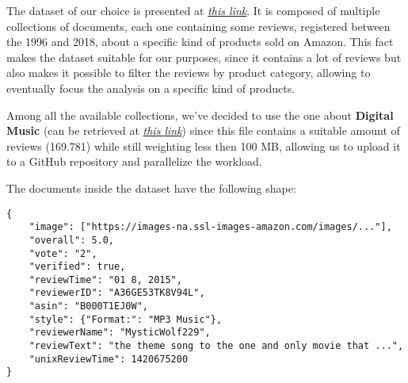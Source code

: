 The dataset of our choice is presented at \href{https://nijianmo.github.io/amazon/index.html}{\textit{this link}}. It is composed of multiple collections of documents, each one containing some reviews, registered between the 1996 and 2018, about a specific kind of products sold on Amazon. This fact makes the dataset suitable for our purposes, since it contains a lot of reviews but also makes it possible to filter the reviews by product category, allowing to eventually focus the analysis on a specific kind of products.

Among all the available collections, we've decided to use the one about \textbf{Digital Music} (can be retrieved at \href{https://jmcauley.ucsd.edu/data/amazon_v2/categoryFilesSmall/Digital_Music_5.json.gz}{\textit{this link}}) since this file contains a suitable amount of reviews (169.781) while still weighting less then 100 MB, allowing us to upload it to a GitHub repository and parallelize the workload.

The documents inside the dataset have the following shape: \\
\begin{verbatim}
{
    "image": ["https://images-na.ssl-images-amazon.com/images/..."], 
    "overall": 5.0, 
    "vote": "2",
    "verified": true, 
    "reviewTime": "01 8, 2015", 
    "reviewerID": "A36GE53TK8V94L", 
    "asin": "B000T1EJ0W", 
    "style": {"Format:": "MP3 Music"}, 
    "reviewerName": "MysticWolf229", 
    "reviewText": "the theme song to the one and only movie that ...", 
    "unixReviewTime": 1420675200
}
\end{verbatim}

